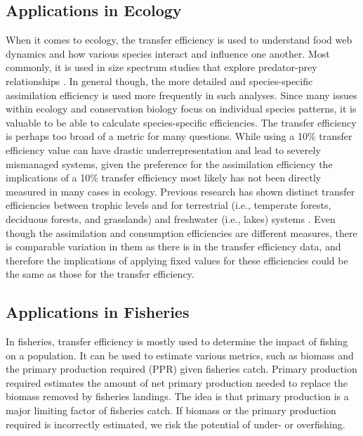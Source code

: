 \documentclass[oneside,12pt,final]{sty/ucthesis-CA2012}
\let\cite\citep                             %
\begin{document}
\begin{mainmatter}
\subsection{Applications in Ecology}
When it comes to ecology, the transfer efficiency is used to understand food web dynamics and how various species interact and influence one another. Most commonly, it is used in size spectrum studies that explore predator-prey relationships \cite{barnes2010global}. In general though, the more detailed and species-specific assimilation efficiency is used more frequently in such analyses. Since many issues within ecology and conservation biology focus on individual species patterns, it is valuable to be able to calculate species-specific efficiencies. The transfer efficiency is perhaps too broad of a metric for many questions. While using a 10\% transfer efficiency value can have drastic underrepresentation and lead to severely mismanaged systems, given the preference for the assimilation efficiency the implications of a 10\% transfer efficiency most likely has not been directly measured in many cases in ecology. Previous research has shown distinct transfer efficiencies between trophic levels and for terrestrial (i.e., temperate forests, deciduous forests, and grasslands) and freshwater (i.e., lakes) systems \cite{hairston1993causeeffect}. Even though the assimilation and consumption efficiencies are different measures, there is comparable variation in them as there is in the transfer efficiency data, and therefore the implications of applying fixed values for these efficiencies could be the same as those for the transfer efficiency.

\subsection{Applications in Fisheries}
In fisheries, transfer efficiency is mostly used to determine the impact of fishing on a population. It can be used to estimate various metrics, such as biomass and the primary production required (PPR) given fisheries catch. Primary production required estimates the amount of net primary production needed to replace the biomass removed by fisheries landings. The idea is that primary production is a major limiting factor of fisheries catch. If biomass or the primary production required is incorrectly estimated, we risk the potential of under- or overfishing. 

\vspace{5mm}


\end{mainmatter}
\end{document}
